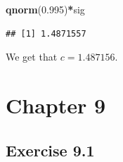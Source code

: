 \documentclass[]{krantz}
\makeatletter
\newenvironment{Shaded}{\begin{snugshade}}{\end{snugshade}}
\newcommand{\KeywordTok}[1]{\textcolor[rgb]{0.13,0.29,0.53}{\textbf{#1}}}
\newcommand{\FloatTok}[1]{\textcolor[rgb]{0.00,0.00,0.81}{#1}}
\newcommand{\OperatorTok}[1]{\textcolor[rgb]{0.81,0.36,0.00}{\textbf{#1}}}
\newcommand{\NormalTok}[1]{#1}
\newenvironment{kframe}{%
\medskip{}
\setlength{\fboxsep}{.8em}
 \def\at@end@of@kframe{}%
 \ifinner\ifhmode%
  \def\at@end@of@kframe{\end{minipage}}%
  \begin{minipage}{\columnwidth}%
 \fi\fi%
 \def\FrameCommand##1{\hskip\@totalleftmargin \hskip-\fboxsep
 \colorbox{shadecolor}{##1}\hskip-\fboxsep
     \hskip-\linewidth \hskip-\@totalleftmargin \hskip\columnwidth}%
 \MakeFramed {\advance\hsize-\width
   \@totalleftmargin\z@ \linewidth\hsize
   \@setminipage}}%
 {\par\unskip\endMakeFramed%
 \at@end@of@kframe}
\renewenvironment{Shaded}{\begin{kframe}}{\end{kframe}}
\theoremstyle{definition}
\theoremstyle{definition}
\theoremstyle{definition}
\theoremstyle{remark}
\makeatother
\begin{document}
\begin{enumerate}
\begin{Shaded}
\begin{Highlighting}[]
\KeywordTok{qnorm}\NormalTok{(}\FloatTok{0.995}\NormalTok{)}\OperatorTok{*}\NormalTok{sig}
\end{Highlighting}
\end{Shaded}

\begin{verbatim}
## [1] 1.4871557
\end{verbatim}

  We get that \(c=1.487156\).
\end{enumerate}

\section*{Chapter 9}\label{chapter-9}


\subsection*{Exercise 9.1}\label{exercise-9.1}
\end{document}
